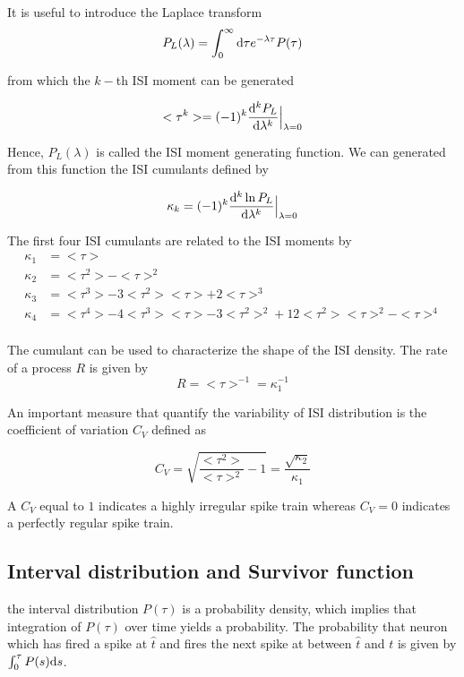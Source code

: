 \documentclass[12pt,twoside]{report}
\def \dd  {{\rm d}}
\begin{document}
It is useful to introduce the Laplace transform
\begin{equation}
\label{eq:Plaplace}
P_L(\lambda)=\int_0^\infty\dd\tau e^{-\lambda \tau}P(\tau)
\end{equation}

from which the  $k-$th ISI moment can be generated

\begin{equation}
\label{eq:Pmoment2}
<\tau^k>=(-1)^k\frac{\dd^k P_L}{\dd \lambda^k}\Bigr|_{\lambda=0}
\end{equation}

Hence, $P_L(\lambda)$ is called the ISI moment generating function. We can generated from this function the ISI cumulants defined by

\begin{equation}
\label{eq:Pcumulant}
\kappa_k=(-1)^k\frac{\dd^k \ln P_L}{\dd \lambda^k}\Bigr|_{\lambda=0}
\end{equation}

The first four ISI cumulants are related to the ISI moments by
\begin{align}
\label{eq:kappa1234}
\kappa_1&=<\tau>\\
\kappa_2&=<\tau^2>-<\tau>^2\\
\kappa_3&=<\tau^3> -3<\tau^2><\tau>+2<\tau>^3\\
\kappa_4&=<\tau^4>-4<\tau^3><\tau>-3<\tau^2>^2+12<\tau^2><\tau>^2-<\tau>^4\\
\end{align}

The cumulant can be used to characterize the shape of the ISI density. The rate of a process $R$ is given by
\begin{equation}
\label{eq:R}
R=<\tau>^{-1}=\kappa_1^{-1}
\end{equation}


An important measure that quantify the variability of ISI distribution is the coefficient of variation $C_V$ defined as


\begin{equation}
\label{eq:CV}
C_V=\sqrt{\frac{<\tau^2>}{<\tau>^2}-1}=\frac{\sqrt{\kappa_2}}{\kappa_1}
\end{equation}

A $C_V$ equal to $1$ indicates a highly irregular spike train whereas  $C_V=0$ indicates a perfectly regular spike train.


\subsection{Interval distribution and Survivor function}
the interval distribution $P(\tau)$ is a probability density, which implies that integration of $P(\tau)$ over time yields a probability. The probability that neuron which has fired a spike at $\hat{t}$ and fires the next spike at between $\hat{t}$ and $t$ is given by $\int_0^\tau P(s) \dd s$.
\end{document}
